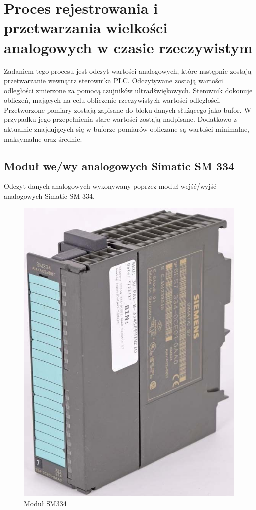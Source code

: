\section{Proces rejestrowania i przetwarzania wielkości analogowych w czasie rzeczywistym}

Zadaniem tego procesu jest odczyt wartości analogowych, które następnie zostają przetwarzanie wewnątrz sterownika PLC. Odczytywane zostają wartości odległości zmierzone za pomocą czujników ultradźwiękowych. Sterownik dokonuje obliczeń, mających na celu obliczenie rzeczywistych wartości odległości. Przetworzone pomiary zostają zapisane do bloku danych służącego jako bufor. W przypadku jego przepełnienia stare wartości zostają nadpisane. Dodatkowo z aktualnie znajdujących się w buforze pomiarów obliczane są wartości minimalne, maksymalne oraz średnie.

\subsection{Moduł we/wy analogowych Simatic SM 334}
Odczyt danych analogowych wykonywany poprzez moduł wejść/wyjść analogowych Simatic SM 334.
\begin{figure}[h]
\centering
\includegraphics[scale=1.2]{Zdjecia/Stanowiska/2_Czujniki_Odleglosci/sm334.jpg}
\caption{Moduł SM334}
\end{figure}

